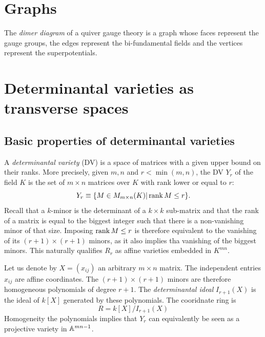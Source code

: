 \section{Graphs}

    The \emph{dimer diagram} of a quiver gauge theory is a graph whose faces represent the gauge groups, the edges represent the bi-fundamental fields and the vertices represent the superpotentials.

\section{Determinantal varieties as transverse spaces}

    \subsection{Basic properties of determinantal varieties}  

            A \emph{determinantal variety} (DV) is a space of matrices with a given upper bound on their ranks. More precisely, given $m,n$ and $r<\min(m,n)$, the DV $Y_r$ of the field $K$ is the set of $m\times n$ matrices over $K$ with rank lower or equal to $r$:
            \begin{equation}
                Y_r\equiv\{M\in M_{m\times n}(K)|\rank M\leq r\}.
            \end{equation}
            Recall that a $k$-minor is the determinant of a $k\times k$ sub-matrix and that the rank of a matrix is equal to the biggest integer such that there is a non-vanishing minor of that size. Imposing $\rank M\leq r$ is therefore equivalent to the vanishing of its $(r+1)\times (r+1)$ minors, as it also implies tha vanishing of the biggest minors. This naturally qualifies $R_r$ as affine varieties embedded in $K^{mn}$. 
            
            Let us denote by $X=(x_{ij})$ an arbitrary $m\times n$ matrix. The independent entries $x_{ij}$ are affine coordinates. The $(r+1)\times(r+1)$ minors are therefore homogeneous polynomials of degree $r+1$. The \emph{determinantal ideal} $I_{r+1}(X)$ is the ideal of $k[X]$ generated by these polynomials. The cooridnate ring is 
            \begin{equation}
                R=k[X]/I_{r+1}(X)
            \end{equation}
            Homogeneity the polynomials implies that $Y_r$ can equivalently be seen as a projective variety in $\mathbb{A}^{mn-1}$.

